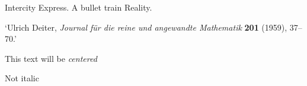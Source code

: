 Intercity Express. A bullet train Reality.

`Ulrich Deiter, {\sl Journal f\"ur die reine und angewandte Mathematik}
{\bf 201} (1959), 37--70.'



\centerline{This text will be  \it centered }
Not italic



